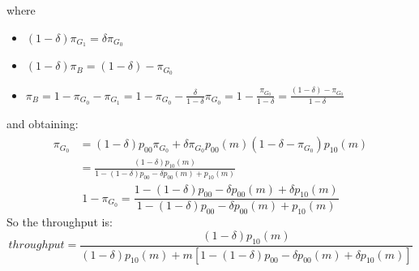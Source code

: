 \documentclass[a4paper, 12pt, openright]{book}
\theoremstyle{theoremdd}
\theoremstyle{remark}
\def \beq {\begin{equation}}
\def\eeq{\end{equation}}
\begin{document}
where
\begin{itemize}
\item $(1-\delta)\pi_{G_1} = \delta\pi_{G_0}$
\item $(1-\delta)\pi_{B} = (1-\delta)-\pi_{G_0}$
\item $\pi_{B} = 1-\pi_{G_0}-\pi_{G_1} = 1-\pi_{G_0}-\frac{\delta}{1-\delta}\pi_{G_0} = 1- \frac{\pi_{G_0}}{1-\delta} = \frac{(1-\delta)-\pi_{G_0}}{1-\delta}$
\end{itemize}
and obtaining:
\begin{align}
\begin{split}
\pi_{G_0} & = (1-\delta)p_{00}\pi_{G_0} + \delta\pi_{G_0} p_{00}(m) (1-\delta-\pi_{G_0})p_{10}(m)\\
& = \frac{(1-\delta)p_{10}(m)}{1-(1-\delta)p_{00}-\delta p_{00}(m) +p_{10}(m)}                                      
\end{split}
\end{align}
\beq
1-\pi_{G_0} = \frac{1-(1-\delta)p_{00} -\delta p_{00}(m) + \delta p_{10}(m)}{1-(1-\delta)p_{00}-\delta p_{00}(m) +p_{10}(m)}
\eeq
So the throughput is:
\beq
throughput = \frac{(1-\delta)p_{10}(m)}{(1-\delta)p_{10}(m) + m[1-(1-\delta)p_{00}-\delta p_{00}(m)+\delta p_{10}(m)]}
\eeq
\end{document}
